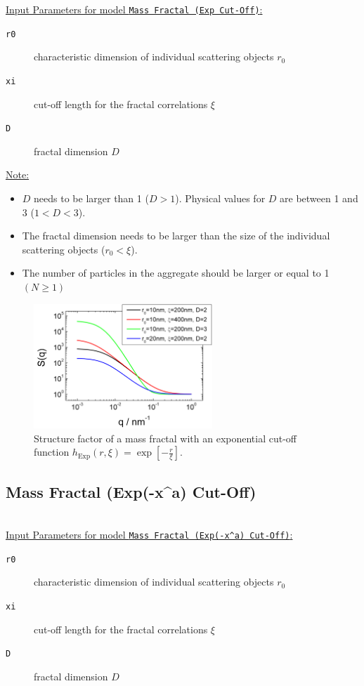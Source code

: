 \underline{Input Parameters for model \texttt{Mass Fractal (Exp Cut-Off)}:}
\begin{description}
\item[\texttt{r0}] characteristic dimension of individual scattering objects $r_0$
\item[\texttt{xi}] cut-off length for the fractal correlations $\xi$
\item[\texttt{D}] fractal dimension $D$
\end{description}

\underline{Note:}
\begin{itemize}
\item $D$ needs to be larger than 1 ($D>1$). Physical values for $D$ are between 1 and 3 ($1<D<3$).
\item The fractal dimension needs to be larger than the size of the individual scattering objects ($r_0 < \xi$).
\item The number of particles in the aggregate should be larger or equal to 1 $(N\geq 1)$
\end{itemize}

\begin{figure}[htb]
\begin{center}
\includegraphics[width=0.6\textwidth]{../images/structure_factor/MassFractals/SQExpCutOff.png}
\end{center}
\caption{Structure factor of a mass fractal with an exponential
cut-off function $h_\text{Exp}(r,\xi) = \exp\left[-\tfrac{r}{\xi}\right]$.}
\label{fig:SQExpCutOff}
\end{figure}


\clearpage
\subsection{Mass Fractal (Exp(-x\^{}a) Cut-Off)}
~\\

\underline{Input Parameters for model \texttt{Mass Fractal (Exp(-x\^{}a) Cut-Off)}:}
\begin{description}
\item[\texttt{r0}] characteristic dimension of individual scattering objects $r_0$
\item[\texttt{xi}] cut-off length for the fractal correlations $\xi$
\item[\texttt{D}] fractal dimension $D$
\end{description}


